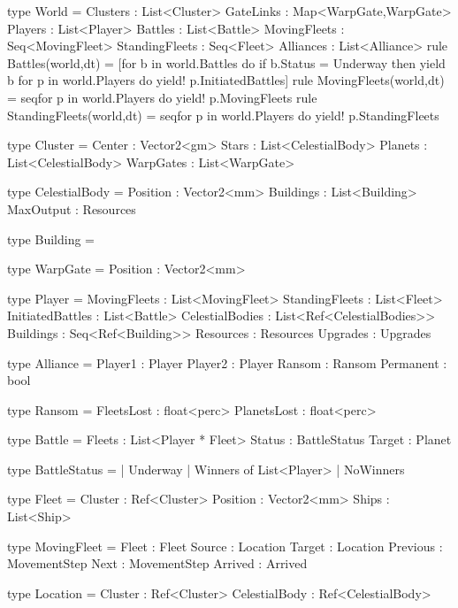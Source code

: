 type World = {
    Clusters        : List<Cluster>
    GateLinks       : Map<WarpGate,WarpGate>
    Players         : List<Player>
    Battles         : List<Battle>
    MovingFleets    : Seq<MovingFleet>
    StandingFleets  : Seq<Fleet>
    Alliances       : List<Alliance>
  }
  rule Battles(world,dt) =
    [for b in world.Battles do 
       if b.Status = Underway then
         yield b
     for p in world.Players do
       yield! p.InitiatedBattles]
  rule MovingFleets(world,dt) =
    seq{for p in world.Players do
          yield! p.MovingFleets }
  rule StandingFleets(world,dt) =
    seq{for p in world.Players do
          yield! p.StandingFleets }


type Cluster = {
    Center      : Vector2<gm>
    Stars       : List<CelestialBody>
    Planets     : List<CelestialBody>
    WarpGates   : List<WarpGate>
  }
  

type CelestialBody = {
    Position    : Vector2<mm>
    Buildings   : List<Building>
    MaxOutput   : Resources
  }
  

type Building = {
  
}


type WarpGate = {
    Position    : Vector2<mm>
}


type Player = {
    MovingFleets     : List<MovingFleet>
    StandingFleets   : List<Fleet>
    InitiatedBattles : List<Battle>
    CelestialBodies  : List<Ref<CelestialBodies>>
    Buildings        : Seq<Ref<Building>>
    Resources        : Resources
    Upgrades         : Upgrades
}

type Alliance = {
  Player1     : Player
  Player2     : Player
  Ransom      : Ransom
  Permanent   : bool
}


type Ransom = {
  FleetsLost  : float<perc>
  PlanetsLost : float<perc>
}


type Battle = {
    Fleets           : List<Player * Fleet>
    Status           : BattleStatus
    Target           : Planet
}


type BattleStatus = 
  | Underway
  | Winners of List<Player>
  | NoWinners

  
type Fleet = {
  Cluster    : Ref<Cluster>
  Position   : Vector2<mm>
  Ships      : List<Ship>
}


type MovingFleet = {
  Fleet       : Fleet
  Source      : Location
  Target      : Location
  Previous    : MovementStep
  Next        : MovementStep
  Arrived     : Arrived
}


type Location = {
  Cluster       : Ref<Cluster>
  CelestialBody : Ref<CelestialBody>
}


